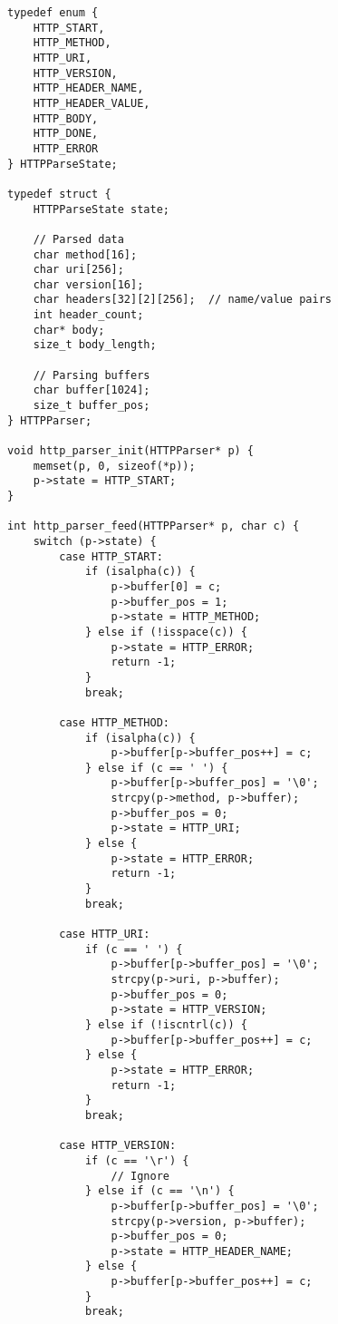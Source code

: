 \begin{lstlisting}
typedef enum {
    HTTP_START,
    HTTP_METHOD,
    HTTP_URI,
    HTTP_VERSION,
    HTTP_HEADER_NAME,
    HTTP_HEADER_VALUE,
    HTTP_BODY,
    HTTP_DONE,
    HTTP_ERROR
} HTTPParseState;

typedef struct {
    HTTPParseState state;

    // Parsed data
    char method[16];
    char uri[256];
    char version[16];
    char headers[32][2][256];  // name/value pairs
    int header_count;
    char* body;
    size_t body_length;

    // Parsing buffers
    char buffer[1024];
    size_t buffer_pos;
} HTTPParser;

void http_parser_init(HTTPParser* p) {
    memset(p, 0, sizeof(*p));
    p->state = HTTP_START;
}

int http_parser_feed(HTTPParser* p, char c) {
    switch (p->state) {
        case HTTP_START:
            if (isalpha(c)) {
                p->buffer[0] = c;
                p->buffer_pos = 1;
                p->state = HTTP_METHOD;
            } else if (!isspace(c)) {
                p->state = HTTP_ERROR;
                return -1;
            }
            break;

        case HTTP_METHOD:
            if (isalpha(c)) {
                p->buffer[p->buffer_pos++] = c;
            } else if (c == ' ') {
                p->buffer[p->buffer_pos] = '\0';
                strcpy(p->method, p->buffer);
                p->buffer_pos = 0;
                p->state = HTTP_URI;
            } else {
                p->state = HTTP_ERROR;
                return -1;
            }
            break;

        case HTTP_URI:
            if (c == ' ') {
                p->buffer[p->buffer_pos] = '\0';
                strcpy(p->uri, p->buffer);
                p->buffer_pos = 0;
                p->state = HTTP_VERSION;
            } else if (!iscntrl(c)) {
                p->buffer[p->buffer_pos++] = c;
            } else {
                p->state = HTTP_ERROR;
                return -1;
            }
            break;

        case HTTP_VERSION:
            if (c == '\r') {
                // Ignore
            } else if (c == '\n') {
                p->buffer[p->buffer_pos] = '\0';
                strcpy(p->version, p->buffer);
                p->buffer_pos = 0;
                p->state = HTTP_HEADER_NAME;
            } else {
                p->buffer[p->buffer_pos++] = c;
            }
            break;


\end{lstlisting}
